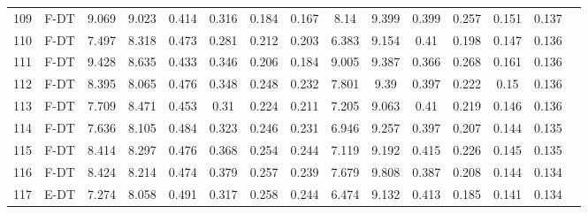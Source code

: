 \begin{longtable}{@{\hskip3pt}c@{\hskip3pt}c@{\hskip3pt}c@{\hskip3pt}c@{\hskip3pt}c@{\hskip3pt}c@{\hskip3pt}c@{\hskip3pt}c@{\hskip3pt}c@{\hskip3pt}c@{\hskip3pt}c@{\hskip3pt}c@{\hskip3pt}c@{\hskip3pt}c@{\hskip3pt}c}
        109 &           F-DT &             9.069 &          9.023 &           0.414 &           0.316 &           0.184 &           0.167 &                8.14 &           9.399 &           0.399 &         0.257 &          0.151 &           0.137 \\
        110 &           F-DT &             7.497 &          8.318 &           0.473 &           0.281 &           0.212 &           0.203 &               6.383 &           9.154 &            0.41 &         0.198 &          0.147 &           0.136 \\
        111 &           F-DT &             9.428 &          8.635 &           0.433 &           0.346 &           0.206 &           0.184 &               9.005 &           9.387 &           0.366 &         0.268 &          0.161 &           0.136 \\
        112 &           F-DT &             8.395 &          8.065 &           0.476 &           0.348 &           0.248 &           0.232 &               7.801 &            9.39 &           0.397 &         0.222 &           0.15 &           0.136 \\
        113 &           F-DT &             7.709 &          8.471 &           0.453 &            0.31 &           0.224 &           0.211 &               7.205 &           9.063 &            0.41 &         0.219 &          0.146 &           0.136 \\
        114 &           F-DT &             7.636 &          8.105 &           0.484 &           0.323 &           0.246 &           0.231 &               6.946 &           9.257 &           0.397 &         0.207 &          0.144 &           0.135 \\
        115 &           F-DT &             8.414 &          8.297 &           0.476 &           0.368 &           0.254 &           0.244 &               7.119 &           9.192 &           0.415 &         0.226 &          0.145 &           0.135 \\
        116 &           F-DT &             8.424 &          8.214 &           0.474 &           0.379 &           0.257 &           0.239 &               7.679 &           9.808 &           0.387 &         0.208 &          0.144 &           0.134 \\
        117 &           E-DT &             7.274 &          8.058 &           0.491 &           0.317 &           0.258 &           0.244 &               6.474 &           9.132 &           0.413 &         0.185 &          0.141 &           0.134 \\

\end{longtable}
